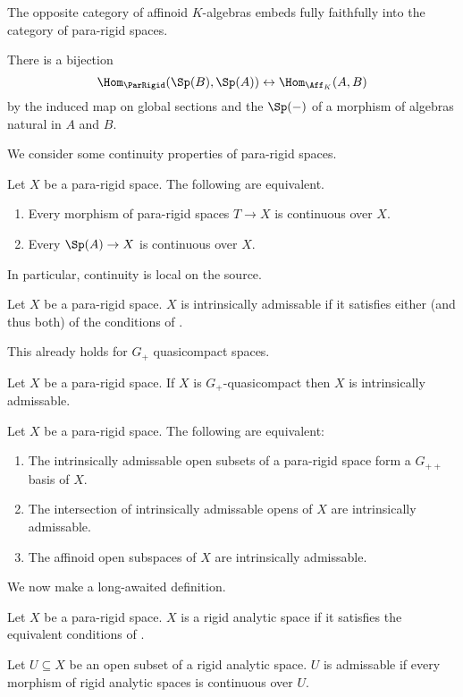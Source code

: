 The opposite category of affinoid $K$-algebras embeds fully faithfully into the category of para-rigid spaces. 
\begin{proposition}\label{def: affinoids fully faithful in pararigid}
    There is a bijection
    $$\Hom_{\ParRigid}(\Sp(B),\Sp(A))\leftrightarrow\Hom_{\Aff_{K}}(A,B)$$
    by the induced map on global sections and the $\Sp(-)$ of a morphism of algebras natural in $A$ and $B$. 
\end{proposition}
We consider some continuity properties of para-rigid spaces. 
\begin{proposition}\label{prop: continuity of pararigid spaces}
    Let $X$ be a para-rigid space. The following are equivalent. 
    \begin{enumerate}[label=(\alph*)]
        \item Every morphism of para-rigid spaces $T\to X$ is continuous over $X$. 
        \item Every $\Sp(A)\to X$ is continuous over $X$. 
    \end{enumerate}
    In particular, continuity is local on the source. 
\end{proposition}
\begin{definition}\label{def: intrinsically admissable}
    Let $X$ be a para-rigid space. $X$ is intrinsically admissable if it satisfies either (and thus both) of the conditions of . 
\end{definition}
This already holds for $G_{+}$ quasicompact spaces. 
\begin{proposition}\label{prop: any G plus qc space is intrinsically admissable}
    Let $X$ be a para-rigid space. If $X$ is $G_{+}$-quasicompact then $X$ is intrinsically admissable. 
\end{proposition}
\begin{proposition}\label{prop: admissability on pararigid spaces}
    Let $X$ be a para-rigid space. The following are equivalent:
    \begin{enumerate}[label=(\alph*)]
        \item The intrinsically admissable open subsets of a para-rigid space form a $G_{++}$ basis of $X$. 
        \item The intersection of intrinsically admissable opens of $X$ are intrinsically admissable. 
        \item The affinoid open subspaces of $X$ are intrinsically admissable. 
    \end{enumerate}
\end{proposition}
We now make a long-awaited definition. 
\begin{definition}\label{def: rigid analytic space}
    Let $X$ be a para-rigid space. $X$ is a rigid analytic space if it satisfies the equivalent conditions of . 
\end{definition}
\begin{definition}\label{def: admissable open}
    Let $U\subseteq X$ be an open subset of a rigid analytic space. $U$ is admissable if every morphism of rigid analytic spaces is continuous over $U$. 
\end{definition}
